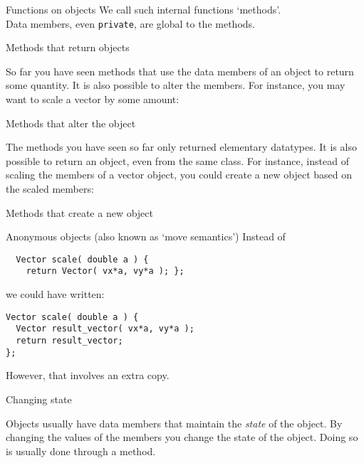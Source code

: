 \begin{slide}{Functions on objects}
  \label{sl:obj-func}
  We call such internal functions `methods'.\\
  Data members, even \lstinline{private}, are global to the methods.
\end{slide}

 {Methods that return objects}

So far you have seen methods that use the data members of an object to
return some quantity. It is also possible to alter the members. 
For instance, you may want to scale a vector by some amount:
%

\begin{slide}{Methods that alter the object}
  \label{sl:obj-func-on}
\end{slide}

The methods you have seen so far only returned elementary
datatypes. It is also possible to return an object, even from the same
class. For instance, instead of scaling the members of a vector object, you
could create a new object based on the scaled members:
%

\begin{slide}{Methods that create a new object}
  \label{sl:obj-return}
\end{slide}

\begin{block}{Anonymous objects}
  \label{sl:obj-return-move}
  (also known as `move semantics')
  Instead of
\begin{lstlisting}
  Vector scale( double a ) {
    return Vector( vx*a, vy*a ); };
\end{lstlisting}
  we could have written:
\begin{lstlisting}
Vector scale( double a ) {
  Vector result_vector( vx*a, vy*a );
  return result_vector;
};
\end{lstlisting}
However, that involves an extra copy.
\end{block}

 {Changing state}

Objects usually have data members that maintain the
\emph{state} of the object. By changing the
values of the members you change the state of the object. Doing so is
usually done through a method.

